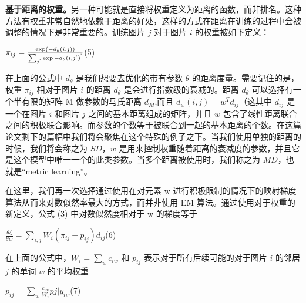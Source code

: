 \documentclass[a4paper,twocolumn]{ctexart}
\begin{document}
\textbf{基于距离的权重。}\quad 另一种可能就是直接将权重定义为距离的函数，而非排名。这种方法有权重非常自然地依赖于距离的好处，这样的方式在距离在训练的过程中会被调整的情况下是非常重要的。训练图片 \(j\) 对于图片 \(i\) 的权重被如下定义：
\begin{center}
\(\pi_{ij} = \frac{\exp(-d_{\theta}(i,j))}{{\sum_{j^`}\exp{-d_{\theta}(i,j^`)}}^`}\)\quad(5)
\end{center}
在上面的公式中 \(d_{\theta}\) 是我们想要去优化的带有参数 \(\theta\) 的距离度量。需要记住的是，权重 \(\pi_{ij}\) 相对于图片 \(i\) 的距离 \(d_{\theta}\) 是会进行指数级的衰减的。距离 \(d_{\theta}\) 可以选择有一个半有限的矩阵 M 做参数的马氏距离 \(d_{M}\),而且 \(d_{w}(i,j) = w^Td_{ij}\)（这其中 \(d_{ij}\) 是一个在图片 \(i\) 和图片 \(j\) 之间的基本距离组成的矩阵，并且 \(w\) 包含了线性距离联合之间的积极联合影响。而参数的个数等于被联合到一起的基本距离的个数。在这篇论文剩下的篇幅中我们将会聚焦在这个特殊的例子之下。当我们使用单独的距离的时候，我们将会称之为 \(SD\)，\(w\) 是用来控制权重随着距离的衰减度的参数，并且它是这个模型中唯一一个的此类参数。当多个距离被使用时，我们称之为 \(MD\)，也就是“metric learning”。

在这里，我们再一次选择通过使用在对元素 w 进行积极限制的情况下的映射梯度算法从而来对数似然率最大的方式，而并非使用 EM 算法。通过使用对于权重的新定义，公式 (3) 中对数似然度相对于 w 的梯度等于
\begin{center}
\(\displaystyle \frac{\theta\zeta}{\theta w} = \displaystyle \sum\limits_{i,j}W_{i}(\pi_{ij} - p_{ij})d_{ij}\)\quad (6)
\end{center}
在上面的公式中，\(W_{i} = \sum\limits_{w}c_{iw}\) 和 \(p_{ij}\) 表示对于所有后续可能的对于图片 \(i\) 的邻居 \(j\) 的单词 \(w\) 的平均权重
\begin{center}
\(p_{ij} = \displaystyle \sum\limits_{w}\frac{c_{iw}}{W_{i}}p{j|y_{iw}}\)\quad (7)
\end{center}

\newpage
\end{document}
